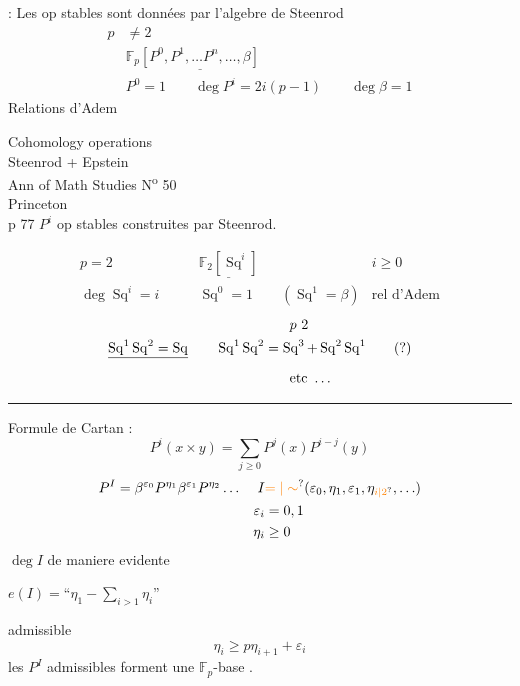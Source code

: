  : Les op stables sont  données par l'algebre de Steenrod
\[
\begin{aligned}
p&\ne2\\
&\mathbb F_p\underline{[P^0,P^1,\ldots P^n,\ldots,\beta]}\\
&P^0=1\qquad\deg P^i=2i(p-1)\qquad\deg\beta=1
\end{aligned}
\]
Relations d'Adem

\noindent Cohomology operations\\
Steenrod + Epstein\\
Ann of Math Studies N\textsuperscript{o} 50\\
Princeton\\
p 77
$P^i$ op stables construites par Steenrod.

\[
\begin{aligned}
p=2\qquad &\underline{\mathbb F_2[\operatorname{Sq}^{i}]} & i\geq0\\
\deg\operatorname{Sq}^{i}=i\qquad&
\operatorname{Sq}^{0}=1\qquad(\operatorname{Sq}^{1}=\beta)&\text{rel d'Adem}
\end{aligned}
\]
\[
\begin{aligned}
&\hspace{13em}p\ 2\\
&\deleted{\operatorname{Sq}^{1}\operatorname{Sq}^{2}=\operatorname{Sq}}\qquad
\operatorname{Sq}^{1}\operatorname{Sq}^{2}=\operatorname{Sq}^{3}+\operatorname{Sq}^{2}\operatorname{Sq}^{1}\qquad(?)\\
&\hspace{13em}\text{etc}\ \ldots
\end{aligned}
\]
\begin{center}\rule{1.3cm}{0.3pt}\end{center}
Formule de Cartan :
\[
P^i(x\times y)=\sum_{j\geq0}P^j(x)P^{i-j}(y)
\]
\[
\begin{aligned}
P^I&=\beta^{\varepsilon_0}P^{\eta_1}\beta^{\varepsilon_1}P^{\eta_2}\ldots
& I&\unsure{=|\sim}(\varepsilon_0,\eta_1,\varepsilon_1,\eta_{\unsure{i|2}},\ldots)\\
&& \varepsilon_i&=0,1\\
&& \eta_i&\geq0
\end{aligned}
\]
$\deg I$ de maniere evidente

 $e(I)=\text{``}\eta_1-\sum_{i>1}\eta_i\text{''}$

admissible
\[
\eta_i\geq p\eta_{i+1}+\varepsilon_i
\]
les $P^I$ admissibles forment une $\mathbb F_p$-base .

